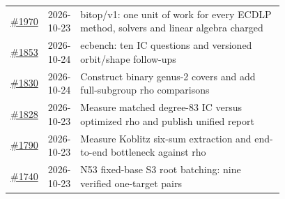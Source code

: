 {\begin{longtable}{@{}r l >{\raggedright\arraybackslash}p{0.78\linewidth}@{}}
\href{https://github.com/aburan28/crypto/pull/1970}{\#1970} & 2026-10-23 & bitop/\allowbreak{}v1: one unit of work for every ECDLP method, solvers and linear algebra charged\\
\href{https://github.com/aburan28/crypto/pull/1853}{\#1853} & 2026-10-24 & ecbench: ten IC questions and versioned orbit/\allowbreak{}shape follow-ups\\
\href{https://github.com/aburan28/crypto/pull/1830}{\#1830} & 2026-10-24 & Construct binary genus-2 covers and add full-subgroup rho comparisons\\
\href{https://github.com/aburan28/crypto/pull/1828}{\#1828} & 2026-10-23 & Measure matched degree-83 IC versus optimized rho and publish unified report\\
\href{https://github.com/aburan28/crypto/pull/1790}{\#1790} & 2026-10-23 & Measure Koblitz six-sum extraction and end-to-end bottleneck against rho\\
\href{https://github.com/aburan28/crypto/pull/1740}{\#1740} & 2026-10-23 & N53 fixed-base S3 root batching: nine verified one-target pairs\\
\end{longtable}}

